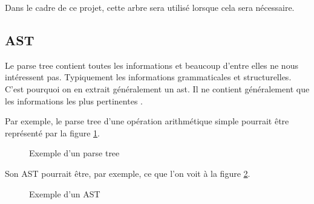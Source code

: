\documentclass[
    iict, %
    il, %
]{heig-tb}
\begin{document}
Dans le cadre de ce projet, cette arbre sera utilisé lorsque cela sera nécessaire.

\subsection{AST}
Le parse tree contient toutes les informations et beaucoup d'entre elles ne nous intéressent pas.
Typiquement les informations grammaticales et structurelles.
C'est pourquoi on en extrait généralement un \Gls{ast}.
Il ne contient généralement que les informations les plus pertinentes \cite{cst}.

Par exemple, le parse tree d'une opération arithmétique simple pourrait être représenté par la figure \ref{parse-tree}.

\begin{figure}[!h]
    \begin{center}
    \end{center}
    \caption[Exemple d'un parse tree]{\label{parse-tree} Exemple d'un parse tree}
\end{figure}

Son AST pourrait être, par exemple, ce que l'on voit à la figure \ref{ast}.

\begin{figure}[!h]
    \begin{center}
    \end{center}
    \caption[Exemple d'un AST]{\label{ast} Exemple d'un AST}
\end{figure}
\end{document}
